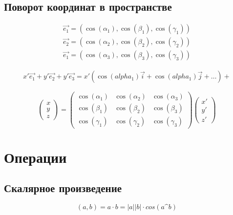 \documentclass[12pt, a4paper]{article}
\begin{document}
    \subsection{Поворот координат в пространстве}
    
    \begin{gather}
        \vec{e_1} = (\cos(\alpha_1), \cos(\beta_1), \cos(\gamma_1)) \\
        \vec{e_2} = (\cos(\alpha_2), \cos(\beta_2), \cos(\gamma_2)) \\
        \vec{e_1} = (\cos(\alpha_3), \cos(\beta_3), \cos(\gamma_3))
    \end{gather}

    \begin{gather}
        x' \vec{e_1} + y' \vec{e_2} + y' \vec{e_3} = x' (\cos(alpha_1)\vec{i} + \cos(alpha_1)\vec{j} +\ldots) + 
    \end{gather}

    \begin{equation}
        \begin{pmatrix}
            x \\
            y \\
            z
        \end{pmatrix} = \begin{pmatrix}
            \cos(\alpha_1) & \cos(\alpha_2) & \cos(\alpha_3) \\
            \cos(\beta_1) & \cos(\beta_2) & \cos(\beta_3) \\
            \cos(\gamma_1) & \cos(\gamma_2) & \cos(\gamma_3)
        \end{pmatrix} \begin{pmatrix}
            x' \\
            y' \\
            z'
        \end{pmatrix}
    \end{equation}

    \section{Операции}

    \subsection{Скалярное произведение}
    \begin{definition}
        \begin{equation}
            (a, b) = a \cdot b = |a||b| \cdot cos(a\^b)
        \end{equation}
    \end{definition}
\end{document}
